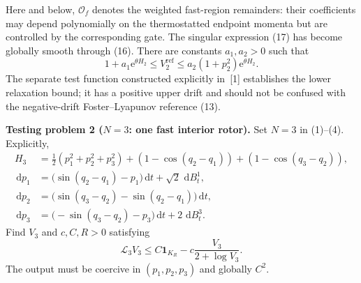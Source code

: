 \documentclass[11pt]{article}
\newcommand{\1}{\mathbf{1}}
\newcommand{\cL}{\mathcal{L}}
\newcommand{\cO}{\mathcal{O}}
\newcommand{\ee}{\mathrm{e}}
\newcommand{\dd}{\,\mathrm{d}}
\begin{document}
Here and below, $\cO_f$ denotes the weighted fast-region remainders: their coefficients may depend polynomially on the thermostatted endpoint momenta but are controlled by the corresponding gate. The singular expression (17) has become globally smooth through (16). There are constants $a_1,a_2>0$ such that
\begin{equation}
1+a_1\ee^{\theta H_2}\le V_2^{\mathrm{ref}}\le a_2(1+p_2^2)\ee^{\theta H_2}.
\end{equation}
The separate test function constructed explicitly in~[1] establishes the lower relaxation bound; it has a positive upper drift and should not be confused with the negative-drift Foster--Lyapunov reference (13).

\medskip
\noindent\textbf{Testing problem 2 ($N=3$: one fast interior rotor).}
Set $N=3$ in (1)--(4). Explicitly,
\begin{align*}
H_3&=\frac12(p_1^2+p_2^2+p_3^2)+(1-\cos(q_2-q_1))+(1-\cos(q_3-q_2)),\\
\dd p_1&=\bigl(\sin(q_2-q_1)-p_1\bigr)\dd t+\sqrt2\,\dd B_t^1,\\
\dd p_2&=\bigl(\sin(q_3-q_2)-\sin(q_2-q_1)\bigr)\dd t,\\
\dd p_3&=\bigl(-\sin(q_3-q_2)-p_3\bigr)\dd t+2\,\dd B_t^3.
\end{align*}
Find $V_3$ and $c,C,R>0$ satisfying
\begin{equation}
\cL_3V_3\le C\1_{K_R}-c\frac{V_3}{2+\log V_3}.
\end{equation}
The output must be coercive in $(p_1,p_2,p_3)$ and globally $C^2$.
\end{document}
